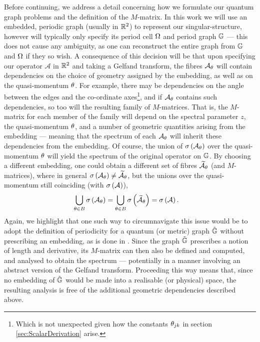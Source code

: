 Before continuing, we address a detail concerning how we formulate our quantum graph problems and the definition of the $M$-matrix.
In this work we will use an embedded, periodic graph (usually in $\mathbb{R}^2$) to represent our singular-structure, however will typically only specify its period cell $\Omega$ and period graph $\mathbb{G}$ --- this does not cause any ambiguity, as one can reconstruct the entire graph from $\mathbb{G}$ and $\Omega$ if they so wish.
A consequence of this decision will be that upon specifying our operator $\mathcal{A}$ in $\mathbb{R}^2$ and taking a Gelfand transform, the fibres $\mathcal{A}_{\theta}$ will contain dependencies on the choice of geometry assigned by the embedding, as well as on the quasi-momentum $\theta$.
For example, there may be dependencies on the angle between the edges and the co-ordinate axes\footnote{Which is not unexpected given how the constants $\theta_{jk}$ in section \ref{sec:ScalarDerivation} arise.}, and if $\mathcal{A}_{\theta}$ contains such dependencies, so too will the resulting family of $M$-matrices.
That is, the $M$-matrix for each member of the family will depend on the spectral parameter $z$, the quasi-momentum $\theta$, and a number of geometric quantities arising from the embedding --- meaning that the spectrum of each $\mathcal{A}_{\theta}$ will inherit these dependencies from the embedding.
Of course, the union of $\sigma\left( \mathcal{A}_{\theta} \right)$ over the quasi-momentum $\theta$ will yield the spectrum of the original operator on $\mathbb{G}$.
By choosing a different embedding, one could obtain a different set of fibres $\widetilde{\mathcal{A}}_{\theta}$ (and $M$-matrices), where in general $\sigma\left( \mathcal{A}_{\theta} \right) \neq \widetilde{\mathcal{A}}_{\theta}$, but the unions over the quasi-momentum still coinciding (with $\sigma\left( \mathcal{A} \right)$),
\begin{align*}
	\bigcup_{\theta\in B} \sigma\left( \mathcal{A}_{\theta} \right) &= \bigcup_{\theta\in B} \sigma\left( \widetilde{\mathcal{A}}_{\theta} \right) = \sigma\left( \mathcal{A} \right).
\end{align*}
Again, we highlight that one such way to circumnavigate this issue would be to adopt the definition of periodicity for a quantum (or metric) graph $\tilde{\mathbb{G}}$ without prescribing an embedding, as is done in \cite[Chapter~4]{berkolaiko2013introduction}.
Since the graph $\tilde{\mathbb{G}}$ prescribes a notion of length and derivative, its $M$-matrix can then also be defined and computed, and analysed to obtain the spectrum --- potentially in a manner involving an abstract version of the Gelfand transform.
Proceeding this way means that, since no embedding of $\tilde{\mathbb{G}}$ would be made into a realisable (or physical) space, the resulting analysis is free of the additional geometric dependencies described above.

